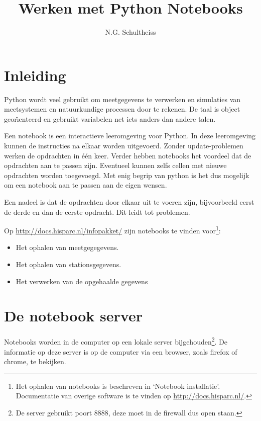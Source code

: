 

\title{Werken met Python Notebooks}
\author{N.G. Schultheiss}



\maketitle

\section{Inleiding}

Python wordt veel gebruikt om meetgegevens te verwerken en simulaties van meetsystemen en natuurkundige
processen door te rekenen. De taal is object geor\"\i enteerd en gebruikt variabelen net iets anders dan andere
talen.

Een notebook is een interactieve leeromgeving voor Python. In deze leeromgeving kunnen de instructies na elkaar worden
uitgevoerd. Zonder update-problemen werken de opdrachten in \'{e}\'{e}n keer. Verder hebben notebooks het voordeel
dat de opdrachten aan te passen zijn. Eventueel kunnen zelfs cellen met nieuwe opdrachten worden toegevoegd. Met
enig begrip van python is het dus mogelijk om een notebook aan te passen aan de eigen wensen.

Een nadeel is dat de opdrachten door elkaar uit te voeren zijn, bijvoorbeeld eerst de derde en dan de eerste opdracht. Dit leidt tot problemen.

Op \url{http://docs.hisparc.nl/infopakket/} zijn notebooks te vinden voor\footnote{Het ophalen van notebooks is beschreven in `Notebook installatie'. Documentatie van overige \hisparc software is te vinden op \url{http://docs.hisparc.nl/}.}:
\begin{itemize}
\item Het ophalen van meetgegegevens.
\item Het ophalen van stationsgegevens.
\item Het verwerken van de opgehaalde gegevens
\end{itemize}

\section{De notebook server}

Notebooks worden in de computer op een lokale server bijgehouden\footnote{De server gebruikt poort 8888, deze moet in de firewall dus open staan.}. De informatie op deze server is op de computer via een browser, zoals firefox of chrome, te bekijken.

